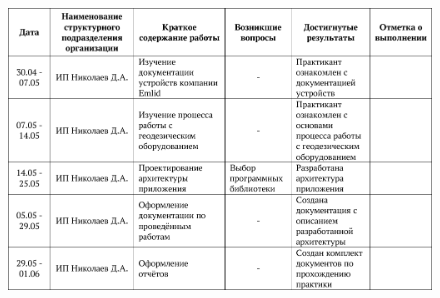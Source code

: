 \documentclass[pta]{../../../scs-iam}
\begin{document}
\restoregeometry
\normalsize

\clearpage

\setcounter{page}{2}

{
  \parindent 0pt

  \begin{center}
    \begin{figure}[h!]
      \centering
      \setlength{\fboxsep}{0pt}
      \includegraphics[width=\textwidth]{table}
    \end{figure}
  \end{center}
}
\end{document}
